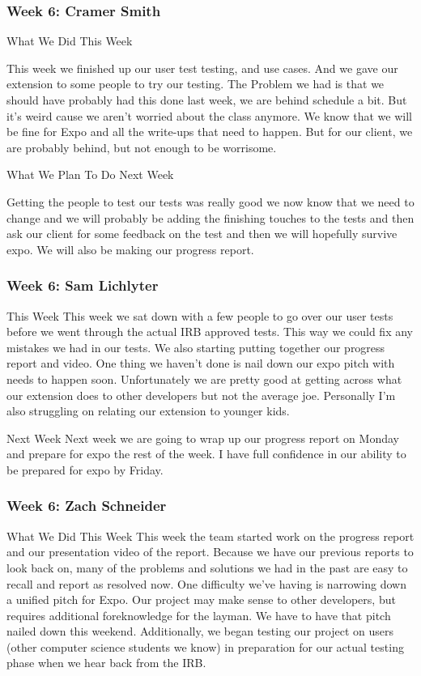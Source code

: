 \subsubsection{Week 6: Cramer Smith}

What We Did This Week

This week we finished up our user test testing, and use cases. And we gave our extension to some people to try our testing. The Problem we had is that we should have probably had this done last week, we are behind schedule a bit. But it's weird cause we aren't worried about the class anymore. We know that we will be fine for Expo and all the write-ups that need to happen. But for our client, we are probably behind, but not enough to be worrisome. 

What We Plan To Do Next Week

Getting the people to test our tests was really good we now know that we need to change and we will probably be adding the finishing touches to the tests and then ask our client for some feedback on the test and then we will hopefully survive expo. We will also be making our progress report.


\subsubsection{Week 6: Sam Lichlyter}

This Week
This week we sat down with a few people to go over our user tests before we went through the actual IRB approved tests. This way we could fix any mistakes we had in our tests. We also starting putting together our progress report and video. One thing we haven't done is nail down our expo pitch with needs to happen soon. Unfortunately we are pretty good at getting across what our extension does to other developers but not the average joe. Personally I'm also struggling on relating our extension to younger kids.

Next Week
Next week we are going to wrap up our progress report on Monday and prepare for expo the rest of the week. I have full confidence in our ability to be prepared for expo by Friday.

\subsubsection{Week 6: Zach Schneider}

What We Did This Week
This week the team started work on the progress report and our presentation video of the report. Because we have our previous reports to look back on, many of the problems and solutions we had in the past are easy to recall and report as resolved now. One difficulty we've having is narrowing down a unified pitch for Expo. Our project may make sense to other developers, but requires additional foreknowledge for the layman. We have to have that pitch nailed down this weekend. Additionally, we began testing our project on users (other computer science students we know) in preparation for our actual testing phase when we hear back from the IRB.

